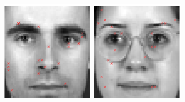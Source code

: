 \begin{figure}
\begin{center}
\includegraphics[width=\textwidth/9]{ch4/figures/NoC5.png}
\includegraphics[width=\textwidth/9]{ch4/figures/NoC6.png}

\end{center}
\end{figure}
